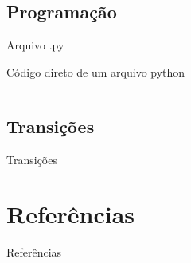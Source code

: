 \documentclass[table,xcolor=table]{apresentacoes/exemplo-2/IFMG-beamer}
\begin{document}
\subsection{Programação}



\begin{frame}{Arquivo .py}
    \begin{block}{Código direto de um arquivo python}
        \inputminted{python}{codigos/codigo.py}
    \end{block}
    
\end{frame}

\subsection{Transições}
\begin{frame}{Transições}
\end{frame}

\section{Referências}
\begin{frame}[allowframebreaks]{Referências}
%


\end{frame}


\end{document}
